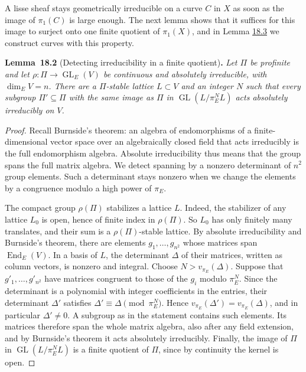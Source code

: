 \documentclass[11pt]{article}
\newenvironment{bpstatement}[2]{\par\addvspace{0.6\baselineskip}\noindent\textbf{#1}#2\textbf{.}\enspace\ignorespaces}
  {\par\addvspace{0.4\baselineskip}}
\newenvironment{bpstatementit}[2]{\begin{bpstatement}{#1}{#2}\itshape\ignorespaces}{\end{bpstatement}}
\providecommand{\GL}{}\renewcommand{\GL}{\operatorname{GL}}
\begin{document}
\label{bp7}%
A lisse sheaf stays geometrically irreducible on a curve \(C\) in \(X\) as soon as the image of \(\pi_1(C)\) is large enough. The next lemma shows that it suffices for this image to surject onto one finite quotient of \(\pi_1(X)\), and in Lemma \hyperref[bp11]{18.3} we construct curves with this property.

\label{bp8}%
\begin{bpstatementit}{Lemma~18.2}{ (Detecting irreducibility in a finite quotient)}
Let \(\Pi\) be profinite and let \(\rho:\Pi\to\GL_E(V)\) be continuous and absolutely irreducible, with \(\dim_E V=n\). There are a \(\Pi\)-stable lattice \(L\subset V\) and an integer \(N\) such that every subgroup \(\Pi'\subseteq\Pi\) with the same image as \(\Pi\) in \(\GL(L/\pi_E^NL)\) acts absolutely irreducibly on \(V\).
\end{bpstatementit}

\begin{proof}[{Proof}]\label{bp9}%
Recall Burnside's theorem: an algebra of endomorphisms of a finite-dimensional vector space over an algebraically closed field that acts irreducibly is the full endomorphism algebra. Absolute irreducibility thus means that the group spans the full matrix algebra. We detect spanning by a nonzero determinant of \(n^2\) group elements. Such a determinant stays nonzero when we change the elements by a congruence modulo a high power of \(\pi_E\).

The compact group \(\rho(\Pi)\) stabilizes a lattice \(L\). Indeed, the stabilizer of any lattice \(L_0\) is open, hence of finite index in \(\rho(\Pi)\). So \(L_0\) has only finitely many translates, and their sum is a \(\rho(\Pi)\)-stable lattice. By absolute irreducibility and Burnside's theorem, there are elements \(g_1,\ldots,g_{n^2}\) whose matrices span \(\operatorname{End}_E(V)\). In a basis of \(L\), the determinant \(\Delta\) of their matrices, written as column vectors, is nonzero and integral. Choose \(N>v_{\pi_E}(\Delta)\). Suppose that \(g'_1,\ldots,g'_{n^2}\) have matrices congruent to those of the \(g_i\) modulo \(\pi_E^N\). Since the determinant is a polynomial with integer coefficients in the entries, their determinant \(\Delta'\) satisfies \(\Delta'\equiv\Delta\pmod{\pi_E^N}\). Hence \(v_{\pi_E}(\Delta')=v_{\pi_E}(\Delta)\), and in particular \(\Delta'\ne0\). A subgroup as in the statement contains such elements. Its matrices therefore span the whole matrix algebra, also after any field extension, and by Burnside's theorem it acts absolutely irreducibly. Finally, the image of \(\Pi\) in \(\GL(L/\pi_E^NL)\) is a finite quotient of \(\Pi\), since by continuity the kernel is open.
\end{proof}
\end{document}
